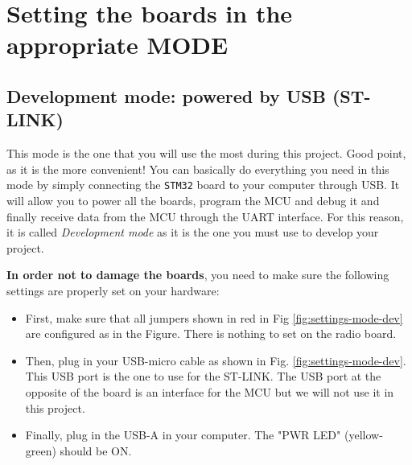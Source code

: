 \clearpage
\section{Setting the boards in the appropriate MODE} \label{sec:modes}

\subsection{Development mode: powered by USB (ST-LINK)} \label{sec:mode-dev}

This mode is the one that you will use the most during this project. Good point, as it is the more convenient! You can basically do everything you need in this mode by simply connecting the \texttt{STM32} board to your computer through USB. It will allow you to power all the boards, program the MCU and debug it and finally receive data from the MCU through the UART interface. For this reason, it is called \textit{Development mode} as it is the one you must use to develop your project.

\textbf{In order not to damage the boards}, you need to make sure the following settings are properly set on your hardware:

\begin{itemize}
    \item First, make sure that all jumpers shown in red in Fig \ref{fig:settings-mode-dev} are configured as in the Figure. There is nothing to set on the radio board.
    \item Then, plug in your USB-micro cable as shown in Fig. \ref{fig:settings-mode-dev}. This USB port is the one to use for the ST-LINK. The USB port at the opposite of the board is an interface for the MCU but we will not use it in this project.
    \item Finally, plug in the USB-A in your computer. The "PWR LED" (yellow-green) should be ON.
\end{itemize}

